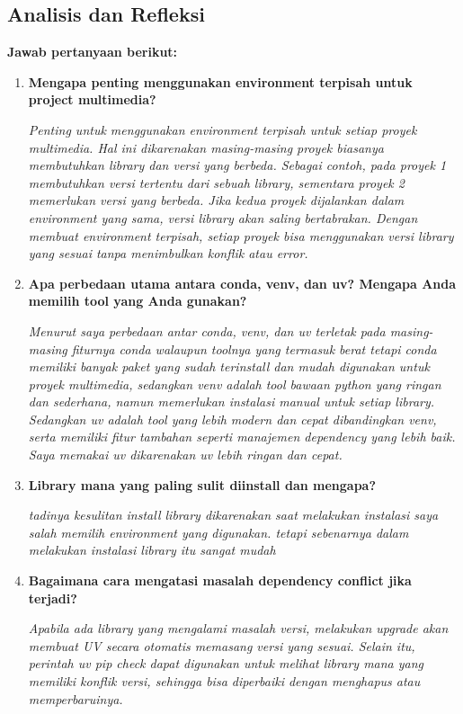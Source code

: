 \documentclass[11pt,a4paper]{article}
\begin{document}
\subsection{Analisis dan Refleksi}
\textbf{Jawab pertanyaan berikut:}

\begin{enumerate}
    \item \textbf{Mengapa penting menggunakan environment terpisah untuk project multimedia?}
    
    \textit{Penting untuk menggunakan environment terpisah untuk setiap proyek multimedia. Hal ini dikarenakan masing-masing proyek biasanya membutuhkan library dan versi yang berbeda. Sebagai contoh, pada proyek 1 membutuhkan versi tertentu dari sebuah library, sementara proyek 2 memerlukan versi yang berbeda. Jika kedua proyek dijalankan dalam environment yang sama, versi library akan saling bertabrakan. Dengan membuat environment terpisah, setiap proyek bisa menggunakan versi library yang sesuai tanpa menimbulkan konflik atau error.}
    
    \item \textbf{Apa perbedaan utama antara conda, venv, dan uv? Mengapa Anda memilih tool yang Anda gunakan?}
    
    \textit{Menurut saya perbedaan antar conda, venv, dan uv terletak pada masing-masing fiturnya conda walaupun toolnya yang termasuk berat tetapi conda memiliki banyak paket yang sudah terinstall dan mudah digunakan untuk proyek multimedia, sedangkan venv adalah tool bawaan python yang ringan dan sederhana, namun memerlukan instalasi manual untuk setiap library. Sedangkan uv adalah tool yang lebih modern dan cepat dibandingkan venv, serta memiliki fitur tambahan seperti manajemen dependency yang lebih baik. Saya memakai uv dikarenakan uv lebih ringan dan cepat.}
    
    \item \textbf{Library mana yang paling sulit diinstall dan mengapa?}
    
    \textit{tadinya kesulitan install library dikarenakan saat melakukan instalasi saya salah memilih environment yang digunakan. tetapi sebenarnya dalam melakukan instalasi library itu sangat mudah}
    
    \item \textbf{Bagaimana cara mengatasi masalah dependency conflict jika terjadi?}
    
    \textit{Apabila ada library yang mengalami masalah versi, melakukan upgrade akan membuat UV secara otomatis memasang versi yang sesuai. Selain itu, perintah uv pip check dapat digunakan untuk melihat library mana yang memiliki konflik versi, sehingga bisa diperbaiki dengan menghapus atau memperbaruinya.}
    

\end{enumerate}
\end{document}

